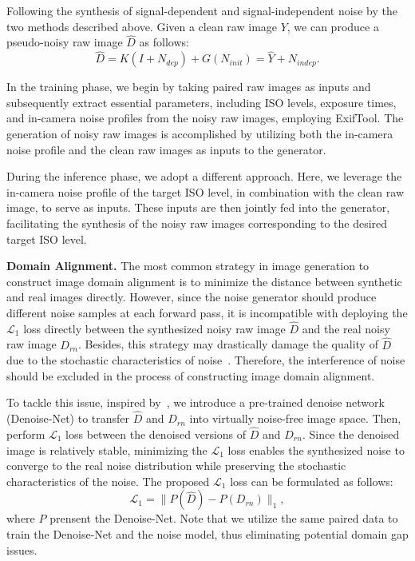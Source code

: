 \documentclass[10pt,twocolumn,letterpaper]{article}
\begin{document}
Following the synthesis of signal-dependent and signal-independent noise by the two methods described above. Given a clean raw image $Y$, we can produce a pseudo-noisy raw image $\hat{D}$ as follows:
\begin{equation}\label{eq:generator}
    \hat{D} = K(I+N_{dep}) + G(N_{init}) = \hat{Y} + N_{indep} .
\end{equation}

In the training phase, we begin by taking paired raw images as inputs and subsequently extract essential parameters, including ISO levels, exposure times, and in-camera noise profiles from the noisy raw images, employing ExifTool. The generation of noisy raw images is accomplished by utilizing both the in-camera noise profile and the clean raw images as inputs to the generator.

During the inference phase, we adopt a different approach. Here, we leverage the in-camera noise profile of the target ISO level, in combination with the clean raw image, to serve as inputs. These inputs are then jointly fed into the generator, facilitating the synthesis of the noisy raw images corresponding to the desired target ISO level.

\textbf{Domain Alignment.} The most common strategy in image generation to construct image domain alignment is to minimize the distance between synthetic and real images directly. However, since the noise generator should produce different noise samples at each forward pass, it is incompatible with deploying the $\mathcal{L}_{1}$ loss directly between the synthesized noisy raw image $\hat{D}$ and the real noisy raw image $D_{rn}$. Besides, this strategy may drastically damage the quality of $\hat{D}$ due to the stochastic characteristics of noise~\cite{cai2021learning}. Therefore, the interference of noise should be excluded in the process of constructing image domain alignment. 

To tackle this issue, inspired by~\cite{cai2021learning}, we introduce a pre-trained denoise network~\cite{chen2018learning} (Denoise-Net) to transfer $\hat{D}$ and $D_{rn}$ into virtually noise-free image space. Then, perform $\mathcal{L}_{1}$ loss between the denoised versions of $\hat{D}$ and $D_{rn}$. Since the denoised image is relatively stable, minimizing the $\mathcal{L}_{1}$ loss enables the synthesized noise to converge to the real noise distribution while preserving the stochastic characteristics of the noise. The proposed $\mathcal{L}_{1}$ loss can be formulated as follows:
\begin{equation}
    \mathcal{L}_{1} = \parallel P(\hat{D}) - P(D_{rn}) \parallel_1 ,
\end{equation}
\noindent where $P$ prensent the Denoise-Net. Note that we utilize the same paired data to train the Denoise-Net and the noise model, thus eliminating potential domain gap issues.
\end{document}
